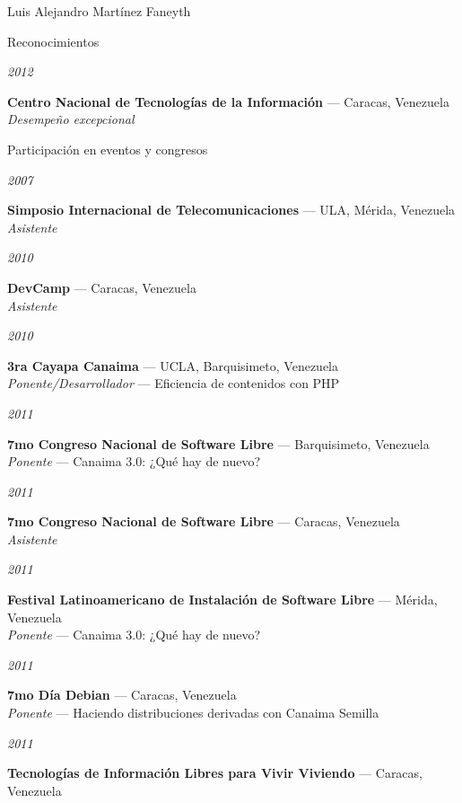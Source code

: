 \documentclass[11pt,letterpaper]{article}
\begin{document}
\begin{cv}{Luis Alejandro Mart\'inez Faneyth}
\begin{cvlist}{Reconocimientos}
\item[{\parbox[t]{6em}{\textit{\large{2012}}}}]{
	\parbox[t]{\linewidth}{
		\textbf{Centro Nacional de Tecnolog\'ias de la Informaci\'on} --- Caracas, Venezuela\\
		\textit{Desempe\~no excepcional}
	}
}
\end{cvlist}

\begin{cvlist}{Participaci\'on en eventos y congresos}
\item[{\parbox[t]{6em}{\textit{\large{2007}}}}]{
	\parbox[t]{\linewidth}{
		\textbf{Simposio Internacional de Telecomunicaciones} --- ULA, M\'erida, Venezuela\\
		\textit{Asistente}
	}
}
\item[{\parbox[t]{6em}{\textit{\large{2010}}}}]{
	\parbox[t]{\linewidth}{
		\textbf{DevCamp} --- Caracas, Venezuela\\
		\textit{Asistente}
	}
}
\item[{\parbox[t]{6em}{\textit{\large{2010}}}}]{
	\parbox[t]{\linewidth}{
		\textbf{3ra Cayapa Canaima} --- UCLA, Barquisimeto, Venezuela\\
		\textit{Ponente/Desarrollador} --- Eficiencia de contenidos con PHP
	}
}
\item[{\parbox[t]{6em}{\textit{\large{2011}}}}]{
	\parbox[t]{\linewidth}{
		\textbf{7mo Congreso Nacional de Software Libre} --- Barquisimeto, Venezuela\\
		\textit{Ponente} --- Canaima 3.0: ¿Qu\'e hay de nuevo?
	}
}
\item[{\parbox[t]{6em}{\textit{\large{2011}}}}]{
	\parbox[t]{\linewidth}{
		\textbf{7mo Congreso Nacional de Software Libre} --- Caracas, Venezuela\\
		\textit{Asistente}
	}
}
\item[{\parbox[t]{6em}{\textit{\large{2011}}}}]{
	\parbox[t]{\linewidth}{
		\textbf{Festival Latinoamericano de Instalaci\'on de Software Libre} --- M\'erida, Venezuela\\
		\textit{Ponente} --- Canaima 3.0: ¿Qu\'e hay de nuevo?
	}
}
\item[{\parbox[t]{6em}{\textit{\large{2011}}}}]{
	\parbox[t]{\linewidth}{
		\textbf{7mo D\'ia Debian} --- Caracas, Venezuela\\
		\textit{Ponente} --- Haciendo distribuciones derivadas con Canaima Semilla
	}
}
\item[{\parbox[t]{6em}{\textit{\large{2011}}}}]{
	\parbox[t]{\linewidth}{
		\textbf{Tecnolog\'ias de Informaci\'on Libres para Vivir Viviendo} --- Caracas, Venezuela\\
}}
\end{cvlist}
\end{cv}
\end{document}
